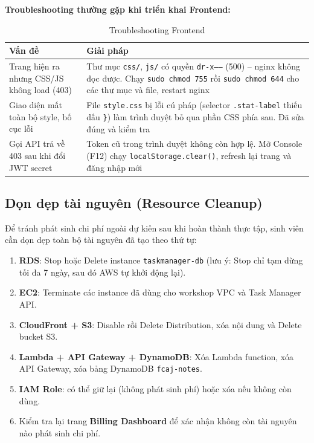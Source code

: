 \documentclass[13pt]{extarticle}
\begin{document}
\textbf{Troubleshooting thường gặp khi triển khai Frontend:}
\begin{longtable}{p{5.5cm}p{8cm}}
\caption{Troubleshooting Frontend}
\label{tab:troubleshoot-frontend} \\
\toprule
\textbf{Vấn đề} & \textbf{Giải pháp} \\
\midrule
\endhead
Trang hiện ra nhưng CSS/JS không load (403) & Thư mục \texttt{css/}, \texttt{js/}
có quyền \texttt{dr-x------} (500) -- nginx không đọc được. Chạy \texttt{sudo
chmod 755} rồi \texttt{sudo chmod 644} cho các thư mục và file, restart nginx \\
Giao diện mất toàn bộ style, bố cục lỗi & File \texttt{style.css} bị lỗi cú
pháp (selector \texttt{.stat-label} thiếu dấu \texttt{\}}) làm trình duyệt bỏ
qua phần CSS phía sau. Đã sửa đúng và kiểm tra \\
Gọi API trả về 403 sau khi đổi JWT secret & Token cũ trong trình duyệt không
còn hợp lệ. Mở Console (F12) chạy \texttt{localStorage.clear()}, refresh
lại trang và đăng nhập mới \\
\bottomrule
\end{longtable}

\subsection{Dọn dẹp tài nguyên (Resource Cleanup)}

Để tránh phát sinh chi phí ngoài dự kiến sau khi hoàn thành thực tập, sinh
viên cần dọn dẹp toàn bộ tài nguyên đã tạo theo thứ tự:

\begin{enumerate}[leftmargin=1.5cm]
    \item \textbf{RDS}: Stop hoặc Delete instance \texttt{taskmanager-db}
    (lưu ý: Stop chỉ tạm dừng tối đa 7 ngày, sau đó AWS tự khởi động lại).
    \item \textbf{EC2}: Terminate các instance đã dùng cho workshop VPC và
    Task Manager API.
    \item \textbf{CloudFront + S3}: Disable rồi Delete Distribution, xóa
    nội dung và Delete bucket S3.
    \item \textbf{Lambda + API Gateway + DynamoDB}: Xóa Lambda function,
    xóa API Gateway, xóa bảng DynamoDB \texttt{fcaj-notes}.
    \item \textbf{IAM Role}: có thể giữ lại (không phát sinh phí) hoặc xóa
    nếu không còn dùng.
    \item Kiểm tra lại trang \textbf{Billing Dashboard} để xác nhận không
    còn tài nguyên nào phát sinh chi phí.
\end{enumerate}
\end{document}
